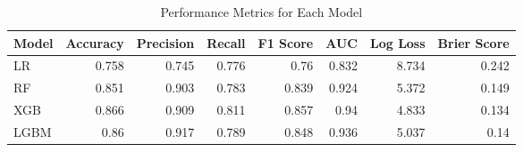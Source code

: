\begin{table}[H]\centering
\caption{Performance Metrics for Each Model}
\label{Table 3 :performance_metrics}
\begin{tabular}{lrrrrrrr}
\toprule
Model & Accuracy & Precision & Recall & F1 Score & AUC & Log Loss & Brier Score \\
\midrule
LR & 0.758 & 0.745 & 0.776 & 0.76 & 0.832 & 8.734 & 0.242 \\
RF & 0.851 & 0.903 & 0.783 & 0.839 & 0.924 & 5.372 & 0.149 \\
XGB & 0.866 & 0.909 & 0.811 & 0.857 & 0.94 & 4.833 & 0.134 \\
LGBM & 0.86 & 0.917 & 0.789 & 0.848 & 0.936 & 5.037 & 0.14 \\
\bottomrule
\end{tabular}
\end{table}
